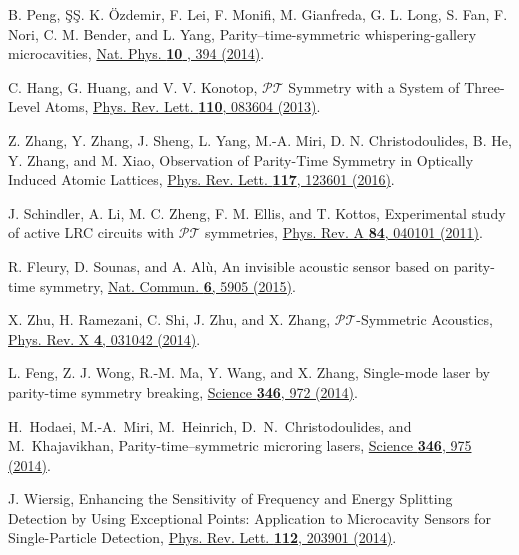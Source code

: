 \documentclass[twocolumn,prl,floatfix,citeautoscript,nofootinbib,superscriptaddress]{revtex4}
\begin{document}
\begin{thebibliography}{99}
 B. Peng, \ifmmode \mbox{\c{S}}\else \c{S}\fi{}. K.
\"Ozdemir, F. Lei, F. Monifi, M. Gianfreda, G. L. Long, S. Fan, F. Nori, C.
M. Bender, and L. Yang, Parity--time-symmetric whispering-gallery
microcavities, \href{https://doi.org/10.1038/nphys2927}{Nat. Phys. \textbf{10%
}, 394 (2014)}.


 C. Hang, G. Huang, and V. V. Konotop, $%
\mathcal{P}\mathcal{T}$ Symmetry with a System of Three-Level Atoms, \href{https://doi.org/10.1103/PhysRevLett.110.083604}%
{Phys. Rev. Lett. \textbf{110}, 083604 (2013)}.

 Z. Zhang, Y. Zhang, J. Sheng, L. Yang,
M.-A. Miri, D. N. Christodoulides, B. He, Y. Zhang, and M. Xiao, Observation
of Parity-Time Symmetry in Optically Induced Atomic Lattices, \href{https://doi.org/10.1103/PhysRevLett.117.123601}%
{Phys. Rev. Lett. \textbf{117}, 123601 (2016)}.


 J. Schindler, A. Li, M. C. Zheng, F. M. Ellis,
and T. Kottos, Experimental study of active LRC circuits with $\mathcal{PT}$
symmetries, \href{https://doi.org/10.1103/PhysRevA.84.040101}{Phys. Rev. A
\textbf{84}, 040101 (2011)}.

 R. Fleury, D. Sounas, and A. Al\`u, An invisible
acoustic sensor based on parity-time symmetry, \href{https://doi.org/10.1038/ncomms6905}%
{Nat. Commun. \textbf{6}, 5905 (2015)}.

 X. Zhu, H. Ramezani, C. Shi, J. Zhu, and X.
Zhang, $\mathcal{P}\mathcal{T}$-Symmetric Acoustics, \href{https://doi.org/10.1103/PhysRevX.4.031042}%
{Phys. Rev. X \textbf{4}, 031042 (2014)}.

 L. Feng, Z. J. Wong, R.-M. Ma, Y. Wang, and X.
Zhang, Single-mode laser by parity-time symmetry breaking, \href{https://doi.org/10.1126/science.1258479}%
{Science \textbf{346}, 972 (2014)}.

 H.~Hodaei, M.-A.~Miri, M.~Heinrich,
D.~N.~Christodoulides, and M.~Khajavikhan, Parity-time--symmetric microring
lasers, \href{https://doi.org/10.1126/science.1258480}{Science \textbf{346},
975 (2014)}.


 J. Wiersig, Enhancing the Sensitivity of
Frequency and Energy Splitting Detection by Using Exceptional Points:
Application to Microcavity Sensors for Single-Particle Detection, \href{https://doi.org/10.1103/PhysRevLett.112.203901}%
{Phys. Rev. Lett. \textbf{112}, 203901 (2014)}.


\end{thebibliography}
\end{document}
